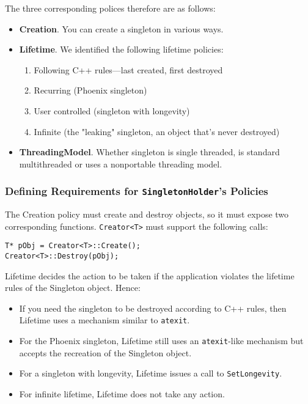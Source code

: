 The three corresponding polices therefore are as follows:
\begin{itemize}
\item \textbf{Creation}. You can create a singleton in various ways.
\item \textbf{Lifetime}. We identified the following lifetime
  policies:
  \begin{enumerate}
  \item Following C++ rules—last created, first destroyed
  \item Recurring (Phoenix singleton)
  \item User controlled (singleton with longevity)
  \item Infinite (the "leaking" singleton, an object that's never destroyed)
  \end{enumerate}
\item \textbf{ThreadingModel}. Whether singleton is single threaded,
  is standard multithreaded or uses a nonportable threading model.
\end{itemize}

\subsubsection{Defining Requirements for \texttt{SingletonHolder}'s
  Policies}

The Creation policy must create and destroy objects, so it must expose
two corresponding functions. \texttt{Creator<T>} must
support the following calls:
\begin{verbatim}
T* pObj = Creator<T>::Create();
Creator<T>::Destroy(pObj);
\end{verbatim}

Lifetime decides the action to be taken if the application violates
the lifetime rules of the Singleton object. Hence:
\begin{itemize}
\item  If you need the singleton to be destroyed according to C++
  rules, then Lifetime uses a mechanism similar to \texttt{atexit}.
\item For the Phoenix singleton, Lifetime still uses an
  \texttt{atexit}-like mechanism but accepts the recreation of the
  Singleton object. 
\item For a singleton with longevity, Lifetime issues a call to
  \texttt{SetLongevity}.
\item For infinite lifetime, Lifetime does not take any action.
\end{itemize}

